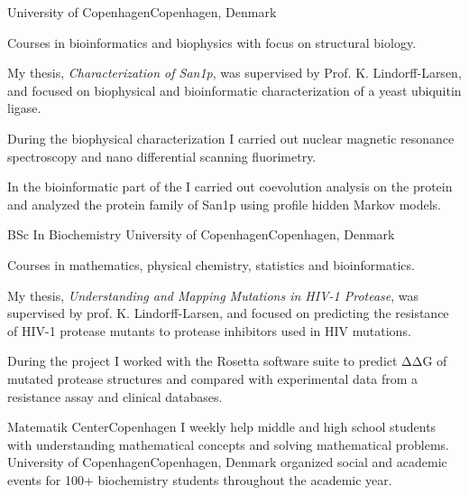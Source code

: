\documentclass{cleancv}
\begin{document}

\begin{edusec}

  {University of Copenhagen}{Copenhagen, Denmark}%
  {%
    Courses in bioinformatics and biophysics with focus on
    structural biology.\vspace{1ex}

    My thesis, \textit{Characterization of San1p}, was supervised by
    Prof. K. Lindorff-Larsen, and focused on biophysical and bioinformatic
    characterization of a yeast ubiquitin ligase.\vspace{1ex}

    During the biophysical characterization I carried out nuclear
    magnetic resonance spectroscopy and nano differential scanning
    fluorimetry.\vspace{1ex}

    In the bioinformatic part of the I carried out coevolution
    analysis on the protein and analyzed the protein family of San1p
    using profile hidden Markov models.%
  }


   {BSc In Biochemistry}%
  {University of Copenhagen}{Copenhagen, Denmark}%
  {%
    Courses in mathematics, physical chemistry, statistics and
    bioinformatics.\vspace{1ex}

    My thesis, \textit{Understanding and Mapping Mutations in HIV-1
      Protease}, was supervised by prof. K. Lindorff-Larsen, and
    focused on predicting the resistance of HIV-1 protease mutants to
    protease inhibitors used in HIV mutations.\vspace{1ex}

    During the project I worked with the Rosetta software suite to
    predict ΔΔG of mutated protease structures and compared with
    experimental data from a resistance assay and clinical databases.%
  }
\end{edusec}

\begin{volsec}
  {Matematik Center}{Copenhagen}%
  {%
    I weekly help middle and high school students with understanding
    mathematical concepts and solving mathematical problems.
  }
  {University of Copenhagen}{Copenhagen, Denmark}%
  {%
   organized social and academic events for 100+ biochemistry
   students throughout the academic year.%
  }
\end{volsec}
\end{document}
